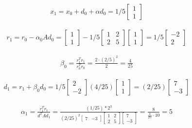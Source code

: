 \documentclass[11pt]{article}
\begin{document}
\begin{align*} %
x_1 = x_0 + d_0 + \alpha d_0 = 1/5\begin{bmatrix}1\\1\end{bmatrix}
\end{align*}

\begin{align*} %
r_1 = r_0-\alpha_0Ad_0 = \begin{bmatrix}1\\1\end{bmatrix}-1/5
\begin{bmatrix}
1 & 2\\
2 & 5
\end{bmatrix}
\begin{bmatrix}
1\\1
\end{bmatrix}
=
1/5
\begin{bmatrix}
-2\\2 
\end{bmatrix}
\end{align*}

\begin{align*}%
\beta_0 = \frac{r_1^T r_1}{r_0^Tr_0} = \frac{2\cdot (2/5)^2}{2} = \frac{4}{25}
\end{align*}

\begin{align*}%
d_1 = r_1 + \beta_0d_0 = 1/5 \begin{bmatrix}
2\\-2
\end{bmatrix}
(4/25)\begin{bmatrix}
1\\1
\end{bmatrix}
= (2/25)\begin{bmatrix}
7\\-3
\end{bmatrix}
\end{align*}

\begin{align*} %
\alpha_1 = \frac{r_1^Tr_1}{d^TAd_1} = \frac{(1/25)*2^3}{(2/25)^2 \begin{bmatrix}
7 & -3
\end{bmatrix} \begin{bmatrix}
1 & 2 \\
2 & 5
\end{bmatrix}
\begin{bmatrix}
7\\-3
\end{bmatrix}}
= \frac{8}{\frac{4}{25}\cdot 10} = 5
\end{align*}
\end{document}
